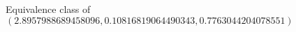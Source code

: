 \documentclass[preview]{standalone}
\begin{document}
\begin{center}
Equivalence class of $(2.8957988689458096, 0.10816819064490343, 0.7763044204078551)$
\end{center}
\end{document}
